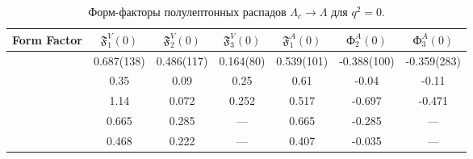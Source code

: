 \begin{table}[H]
    \centering
    \caption{Форм-факторы полулептонных распадов $\Lambda_c \to \Lambda$ для $q^2 = 0$.}
    \begin{tabular}{|c|c|c|c|c|c|c|}
    \hline
    Form Factor & $\mathfrak{F}_1^V(0)$ & $\mathfrak{F}_2^V(0)$ & $\mathfrak{F}_3^V(0)$ & $\mathfrak{F}_1^A(0)$ & $\mathfrak{Ф}_2^A(0)$ & $\mathfrak{Ф}_3^A(0)$ \\
    \hline
    \textbf{\cite{QCD2021}} & 0.687(138) & 0.486(117) & 0.164(80) & 0.539(101) & -0.388(100) & -0.359(283) \\
    \hline
    \textbf{\cite{BagModel1989}} & 0.35 & 0.09 & 0.25 & 0.61 & -0.04 & -0.11 \\
    \hline
    \textbf{\cite{RQM2016}} & 1.14 & 0.072 & 0.252 & 0.517 & -0.697 & -0.471 \\
    \hline
    \textbf{\cite{QSR2009}} & 0.665 & 0.285 & --- & 0.665 & -0.285 & --- \\
    \hline
    \textbf{\cite{LFCQM2018}} & 0.468 & 0.222 & --- & 0.407 & -0.035 & --- \\
    \hline
    \end{tabular}
    \label{tb:chd}
\end{table}
